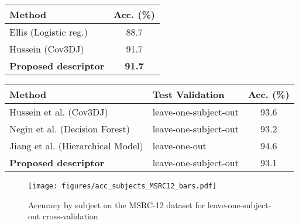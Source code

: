 \documentclass{fcs}
\begin{document}
\doublerulesep 0.1pt
\begin{table}
\begin{footnotesize}
\begin{tabular}{ | p{6cm} | c | } 
	 \hline
	 \rowcolor{lightgray}
	 \centering \textbf{Method} &\textbf{ Acc. (\%)}  \\ 
	 \hline
 	 Ellis (Logistic reg.)\cite{Ellis2013} &  88.7\\ 
	 \hline
	 Hussein (Cov3DJ) \cite{hussein2013human} & 91.7 \\ 
	 \hline	 
	 \textbf{Proposed descriptor} & \textbf{91.7}  \\ 
	 \hline
\end{tabular}
\label{table_acc_MSRC-12_comparativa}
\end{footnotesize}

\end{table}

\doublerulesep 0.1pt
\begin{table}
\begin{footnotesize}
\centering
\begin{tabular}{ | p{3.99cm} | p{1.9cm} | c | } 
	 \hline
	 \rowcolor{lightgray}
	 \centering \textbf{Method} &  \centering \textbf{Test Validation} & \textbf{ Acc. (\%)}  \\ 
	 \hline
	 Hussein et al. (Cov3DJ) \cite{hussein2013human}& leave-one-subject-out & 93.6 \\ 
	 \hline
	 Negin et al. (Decision Forest)\cite{negin2013decision}& leave-one-subject-out & 93.2 \\ 
	 \hline	 
	 Jiang et al. (Hierarchical Model) \cite{Jiang2013}& leave-one-out & 94.6 \\
	 \hline
	 \textbf{Proposed descriptor}& leave-one-subject-out & 93.1  \\ 
	 \hline
\end{tabular}
\label{table_acc_MSRC-12_leave-one-out}
\end{footnotesize}
\end{table}

\begin{figure}
\texttt{[image: figures/acc\_subjects\_MSRC12\_bars.pdf]}
\centering
\caption{Accuracy by subject on the MSRC-12 dataset for leave-one-subject-out cross-validation }
\label{figure_acc_MSRC12_subjects}
\end{figure}
\end{document}
